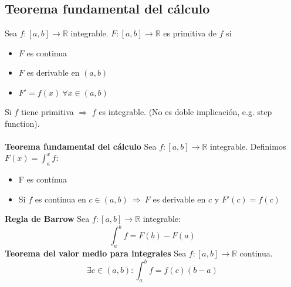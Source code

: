 \documentclass[12pt]{article}
\theoremstyle{plain}
\theoremstyle{definition}
\theoremstyle{remark}
\begin{document}
	\subsection{Teorema fundamental del cálculo}
	Sea $f:[a,b]\to \mathbb{R}$ integrable. $F:[a,b]\to \mathbb{R}$ es primitiva de $f$ si
	\begin{itemize}
		\item $F$ es continua
		\item $F$ es derivable en $(a, b)$
		\item $F'=f(x) \ \forall x \in (a,b)$
	\end{itemize}
	Si $f$ tiene primitiva $\Rightarrow$ $f$ es integrable. (No es doble implicación, e.g. step function).\\
	\\
	\textbf{Teorema fundamental del cálculo}
	Sea $f:[a,b]\to \mathbb{R}$ integrable. Definimos $F(x)=\int_a^xf$:
	\begin{itemize}
		\item F es contínua
		\item Si $f$ es continua en $c\in (a,b) \ \Rightarrow \ F$ es derivable en $c$ y $F'(c)=f(c)$
	\end{itemize}
	\textbf{Regla de Barrow}
	Sea $f:[a,b]\to \mathbb{R}$ integrable:
	\[\int_a^bf=F(b)-F(a)\]
	\textbf{Teorema del valor medio para integrales}
	Sea $f:[a,b]\to \mathbb{R}$ continua.
	\[\exists c \in (a,b) : \int_a^bf=f(c)(b-a) \]
	
\end{document}
